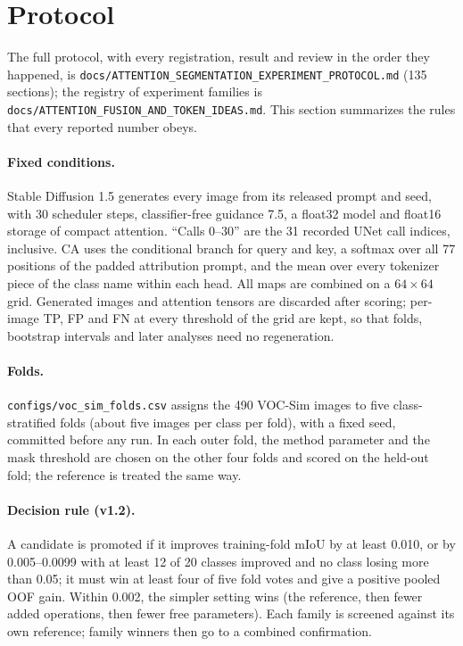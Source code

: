 \section{Protocol}
\label{sec:supp_protocol}
The full protocol, with every registration, result and review in the order they happened, is \texttt{docs/\allowbreak{}ATTENTION\_\allowbreak{}SEGMENTATION\_\allowbreak{}EXPERIMENT\_\allowbreak{}PROTOCOL.md} (135 sections); the registry of experiment families is \texttt{docs/\allowbreak{}ATTENTION\_\allowbreak{}FUSION\_\allowbreak{}AND\_\allowbreak{}TOKEN\_\allowbreak{}IDEAS.md}. This section summarizes the rules that every reported number obeys.

\paragraph{Fixed conditions.}
Stable Diffusion 1.5 generates every image from its released prompt and seed, with 30 scheduler steps, classifier-free guidance 7.5, a float32 model and float16 storage of compact attention. ``Calls 0--30'' are the 31 recorded UNet call indices, inclusive. CA uses the conditional branch for query and key, a softmax over all 77 positions of the padded attribution prompt, and the mean over every tokenizer piece of the class name within each head. All maps are combined on a $64\times64$ grid. Generated images and attention tensors are discarded after scoring; per-image TP, FP and FN at every threshold of the grid are kept, so that folds, bootstrap intervals and later analyses need no regeneration.

\paragraph{Folds.}
\texttt{configs/\allowbreak{}voc\_\allowbreak{}sim\_\allowbreak{}folds.csv} assigns the 490 VOC-Sim images to five class-stratified folds (about five images per class per fold), with a fixed seed, committed before any run. In each outer fold, the method parameter and the mask threshold are chosen on the other four folds and scored on the held-out fold; the reference is treated the same way.

\paragraph{Decision rule (v1.2).}
A candidate is promoted if it improves training-fold mIoU by at least 0.010, or by 0.005--0.0099 with at least 12 of 20 classes improved and no class losing more than 0.05; it must win at least four of five fold votes and give a positive pooled OOF gain. Within 0.002, the simpler setting wins (the reference, then fewer added operations, then fewer free parameters). Each family is screened against its own reference; family winners then go to a combined confirmation.

